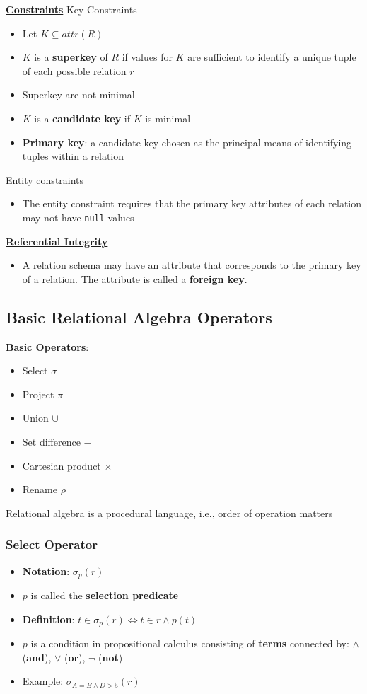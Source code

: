 \textbf{\underline{Constraints}}
\bigskip
Key Constraints
\begin{itemize}
    \item Let $K\subseteq attr(R)$
    \item $K$ is a \textbf{superkey} of $R$ if values for $K$ are sufficient to identify a unique tuple of each possible relation $r$
    \item Superkey are not minimal
    \item $K$ is a \textbf{candidate key} if $K$ is minimal
    \item \textbf{Primary key}: a candidate key chosen as the principal means of identifying tuples within a relation
\end{itemize}
Entity constraints
\begin{itemize}
    \item The entity constraint requires that the primary key attributes of each relation may not have \texttt{null} values
\end{itemize}
\textbf{\underline{Referential Integrity}}
\bigskip
\begin{itemize}
    \item A relation schema may have an attribute that corresponds to the primary key of a relation. The attribute is called a \textbf{foreign key}.
\end{itemize}

\subsection{Basic Relational Algebra Operators}

\textbf{\underline{Basic Operators}}:
\begin{itemize}
    \item Select $\sigma$
    \item Project $\pi$
    \item Union $\cup$
    \item Set difference $-$
    \item Cartesian product $\times$
    \item Rename $\rho$
\end{itemize}

Relational algebra is a procedural language, i.e., order of operation matters

\subsubsection{Select Operator}
\begin{itemize}
    \item \textbf{Notation}: $\sigma_p(r)$
    \item $p$ is called the \textbf{selection predicate}
    \item \textbf{Definition}: $t\in \sigma_p(r) \Leftrightarrow t \in r \land p(t)$
    \item $p$ is a condition in propositional calculus consisting of \textbf{terms} connected by: $\land$ (\textbf{and}), $\lor$ (\textbf{or}), $\lnot$ (\textbf{not})
    \item Example: $\sigma_{A=B\land D >5}(r)$
\end{itemize}

